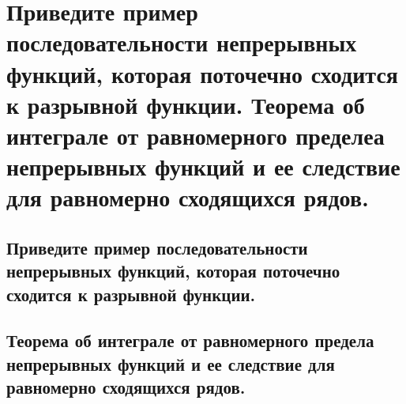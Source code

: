 \section{Приведите пример последовательности непрерывных функций, которая поточечно сходится к разрывной функции. Теорема об интеграле от равномерного пределеа непрерывных функций и ее следствие для равномерно сходящихся рядов.}

\subsection{Приведите пример последовательности непрерывных функций, которая поточечно сходится к разрывной функции.}

\subsection{Теорема об интеграле от равномерного предела непрерывных функций и ее следствие для равномерно сходящихся рядов.}
    
